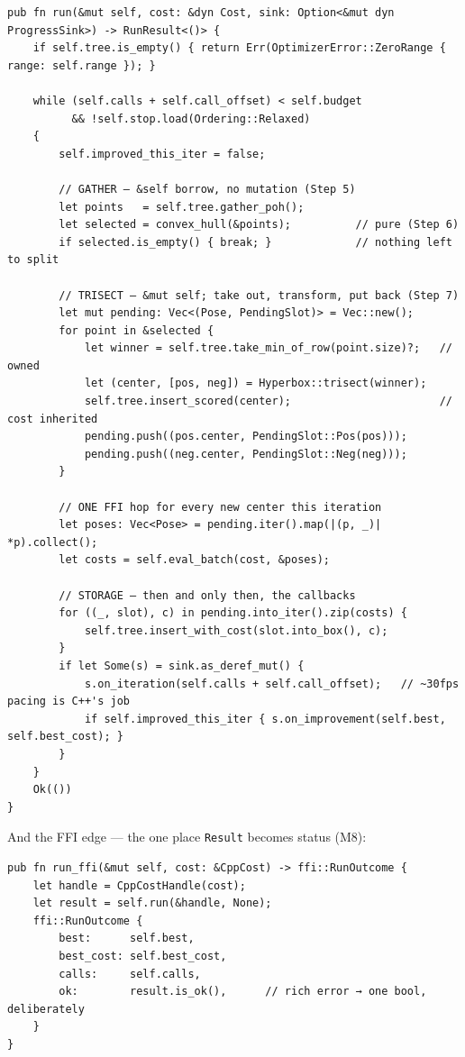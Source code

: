 \documentclass[11pt]{article}
\begin{document}
\begin{verbatim}
pub fn run(&mut self, cost: &dyn Cost, sink: Option<&mut dyn ProgressSink>) -> RunResult<()> {
    if self.tree.is_empty() { return Err(OptimizerError::ZeroRange { range: self.range }); }

    while (self.calls + self.call_offset) < self.budget
          && !self.stop.load(Ordering::Relaxed)
    {
        self.improved_this_iter = false;

        // GATHER — &self borrow, no mutation (Step 5)
        let points   = self.tree.gather_poh();
        let selected = convex_hull(&points);          // pure (Step 6)
        if selected.is_empty() { break; }             // nothing left to split

        // TRISECT — &mut self; take out, transform, put back (Step 7)
        let mut pending: Vec<(Pose, PendingSlot)> = Vec::new();
        for point in &selected {
            let winner = self.tree.take_min_of_row(point.size)?;   // owned
            let (center, [pos, neg]) = Hyperbox::trisect(winner);
            self.tree.insert_scored(center);                       // cost inherited
            pending.push((pos.center, PendingSlot::Pos(pos)));
            pending.push((neg.center, PendingSlot::Neg(neg)));
        }

        // ONE FFI hop for every new center this iteration
        let poses: Vec<Pose> = pending.iter().map(|(p, _)| *p).collect();
        let costs = self.eval_batch(cost, &poses);

        // STORAGE — then and only then, the callbacks
        for ((_, slot), c) in pending.into_iter().zip(costs) {
            self.tree.insert_with_cost(slot.into_box(), c);
        }
        if let Some(s) = sink.as_deref_mut() {
            s.on_iteration(self.calls + self.call_offset);   // ~30fps pacing is C++'s job
            if self.improved_this_iter { s.on_improvement(self.best, self.best_cost); }
        }
    }
    Ok(())
}
\end{verbatim}

And the FFI edge — the one place \texttt{Result} becomes status (M8):

\begin{verbatim}
pub fn run_ffi(&mut self, cost: &CppCost) -> ffi::RunOutcome {
    let handle = CppCostHandle(cost);
    let result = self.run(&handle, None);
    ffi::RunOutcome {
        best:      self.best,
        best_cost: self.best_cost,
        calls:     self.calls,
        ok:        result.is_ok(),      // rich error → one bool, deliberately
    }
}
\end{verbatim}
\end{document}
